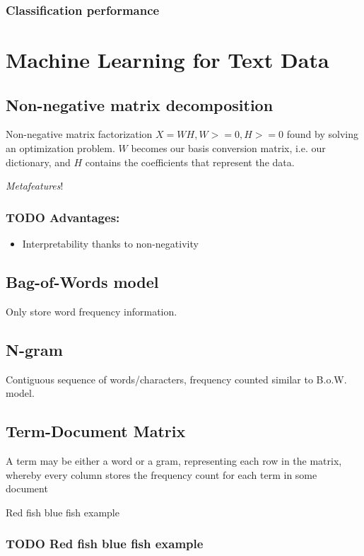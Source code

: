 \documentclass[11pt]{article}
\begin{document}
\subsubsection*{Classification performance}
\label{sec-2-1-1}
\section*{Machine Learning for Text Data}
\label{sec-3}
\subsection*{Non-negative matrix decomposition}
\label{sec-3-1}
Non-negative matrix factorization $X=WH,W>=0,H>=0$ found by solving an optimization problem. $W$ becomes our basis conversion matrix, i.e. our dictionary, and $H$ contains the coefficients that represent the data.

\emph{Metafeatures}!

\subsubsection*{{\bfseries\sffamily TODO} Advantages:}
\label{sec-3-1-1}
\begin{itemize}
\item Interpretability thanks to non-negativity
\end{itemize}

\subsection*{Bag-of-Words model}
\label{sec-3-2}
Only store word frequency information.

\subsection*{N-gram}
\label{sec-3-3}
Contiguous sequence of words/characters, frequency counted similar to B.o.W. model.

\subsection*{Term-Document Matrix}
\label{sec-3-4}
A term may be either a word or a gram, representing each row in the matrix, whereby every column stores the frequency count for each term in some document

Red fish blue fish example

\subsubsection*{{\bfseries\sffamily TODO} Red fish blue fish example}
\label{sec-3-4-1}
\end{document}
